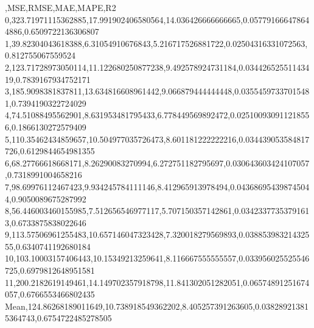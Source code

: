 ,MSE,RMSE,MAE,MAPE,R2
0,323.71971115362885,17.991902406580564,14.036426666666665,0.057791666478644886,0.6509722136306807
1,39.82304043618388,6.31054910676843,5.216717526881722,0.02504316331072563,0.812755067559524
2,123.71728973050114,11.122680250877238,9.492578924731184,0.03442652551143419,0.7839167934752171
3,185.9098381837811,13.634816608961442,9.066879444444448,0.03554597337015481,0.7394190322724029
4,74.51088495562901,8.631953481795433,6.778449569892472,0.025100930911218556,0.1866130272579409
5,110.35462434859657,10.504977035726473,8.601181222222216,0.034439053584817726,0.6129844654981355
6,68.27766618668171,8.26290083270994,6.272751182795697,0.030643603424107057,0.7318991004658216
7,98.69976112467423,9.934245784111146,8.412965913978494,0.043686954398745044,0.9050089675287992
8,56.446003460155985,7.512656546977117,5.707150357142861,0.03423377353791613,0.6733875838022646
9,113.57506961255483,10.657146047323428,7.320018279569893,0.03885398321432555,0.6340741192680184
10,103.10003157406443,10.15349213259641,8.116667555555557,0.033956025525546725,0.6979812648951581
11,200.2182619149461,14.149702357918798,11.841302051282051,0.06574891251674057,0.6766553466802435
Mean,124.86268189011649,10.738918549362202,8.405257391263605,0.038289213815364743,0.6754722485278505
